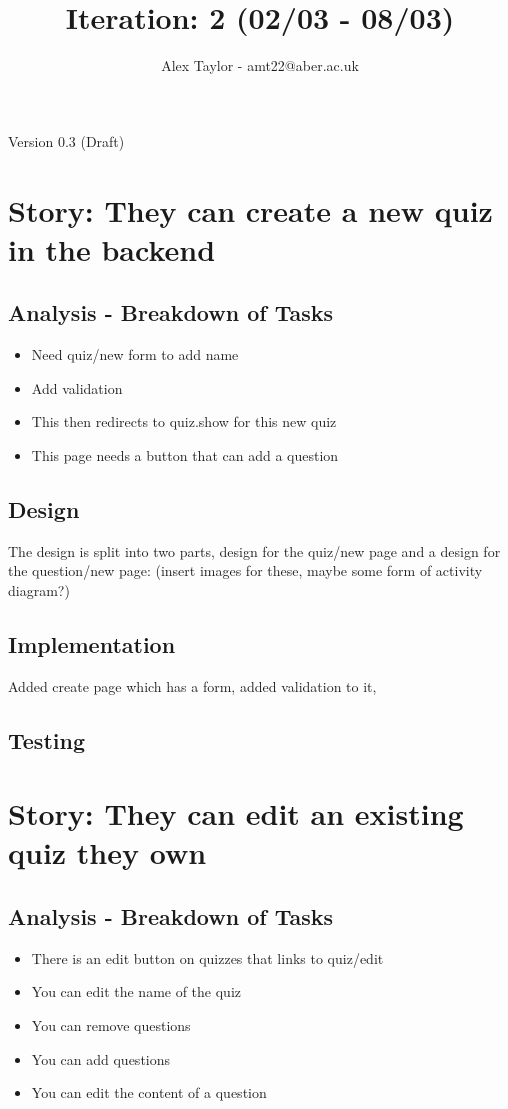 \documentclass{article}
\title{Iteration: 2 (02/03 - 08/03)}
\author{Alex Taylor - amt22@aber.ac.uk}
\begin{document}
\maketitle
\begin{center}
	Version 0.3 (Draft)
\end{center}
\tableofcontents
\thispagestyle{empty}
\newpage

\section{Story: They can create a new quiz in the backend}
\subsection{Analysis - Breakdown of Tasks}
\begin{itemize}
	\item Need quiz/new form to add name
	\item Add validation
	\item This then redirects to quiz.show for this new quiz
	\item This page needs a button that can add a question
\end{itemize}
\subsection{Design}
The design is split into two parts, design for the quiz/new page and a design for the question/new page:
(insert images for these, maybe some form of activity diagram?)
\subsection{Implementation}
Added create page which has a form, added validation to it,
\subsection{Testing}
\newpage

\section{Story: They can edit an existing quiz they own}
\subsection{Analysis - Breakdown of Tasks}
\begin{itemize}
	\item There is an edit button on quizzes that links to quiz/edit
	\item You can edit the name of the quiz
	\item You can remove questions
	\item You can add questions
	\item You can edit the content of a question
\end{itemize}
\end{document}
